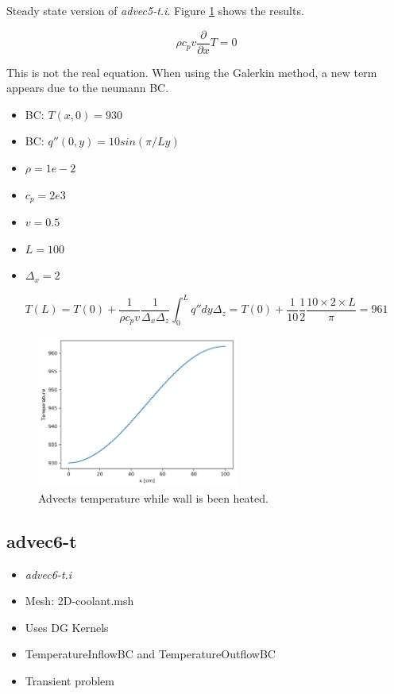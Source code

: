\documentclass[11pt,letterpaper]{article}
\begin{document}
    Steady state version of \textit{advec5-t.i}.
    Figure \ref{fig:advec5-ss} shows the results.

	\begin{equation}
    \rho c_p v \frac{\partial}{\partial x} T = 0
	\end{equation}

	This is not the real equation. When using the Galerkin method, a new term appears due to the neumann BC.

	\begin{itemize}
		\item BC: $T(x, 0) = 930$
		\item BC: $q''(0, y) = 10 sin (\pi/L y)$
		\item $\rho = 1e-2$
		\item $c_p = 2e3$
		\item $v = 0.5$
		\item $L = 100$
		\item $\Delta_x = 2$
	\end{itemize}

	\begin{equation}
	T(L) = T(0) + \frac{1}{\rho c_p v}\frac{1}{\Delta_x \Delta_z}\int^L_0 q'' dy \Delta_z = T(0) + \frac{1}{10} \frac{1}{2} \frac{10 \times 2 \times L}{\pi} = 961
	\end{equation}

	\begin{figure}[htbp!]
		\centering
		\includegraphics[height=5cm]{advec5-ss}
		\caption{Advects temperature while wall is been heated.}
		\label{fig:advec5-ss}
	\end{figure}

	\subsection{advec6-t}

	\begin{itemize}
		\item \textit{advec6-t.i}
		\item Mesh: 2D-coolant.msh
		\item Uses DG Kernels
		\item TemperatureInflowBC and TemperatureOutflowBC
		\item Transient problem
	\end{itemize}
\end{document}
